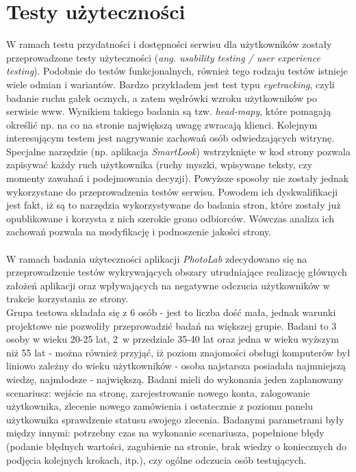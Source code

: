 \section{Testy użyteczności}
\quad W ramach testu przydatności i dostępności serwisu dla użytkowników zostały przeprowadzone testy użyteczności (\textit{ang. usability testing / user experience testing}). Podobnie do testów funkcjonalnych, również tego rodzaju testów istnieje wiele odmian i wariantów. Bardzo przykładem jest test typu \textit{eyetracking}, czyli badanie ruchu gałek ocznych, a zatem wędrówki wzroku użytkowników po serwisie www. Wynikiem takiego badania są tzw. \textit{head-mapy}, które pomagają określić np. na co na stronie największą uwagę zwracają klienci. Kolejnym interesującym testem jest nagrywanie zachowań osób odwiedzających witrynę. Specjalne narzędzie (np. aplikacja \textit{SmartLook}) wstrzyknięte w kod strony pozwala zapisywać każdy ruch użytkownika (ruchy myszki, wpisywane teksty, czy momenty zawahań i podejmowania decyzji). Powyższe sposoby nie zostały jednak wykorzystane do przeprowadzenia testów serwisu. Powodem ich dyskwalifikacji jest fakt, iż są to narzędzia wykorzystywane do badania stron, które zostały już opublikowane i korzysta z nich szerokie grono odbiorców. Wówczas analiza ich zachowań pozwala na modyfikację i podnoszenie jakości strony. \\
\\
W ramach badania użyteczności aplikacji \textit{PhotoLab} zdecydowano się na przeprowadzenie testów wykrywających obszary utrudniające realizację głównych założeń aplikacji oraz wpływających na negatywne odczucia użytkowników w trakcie korzystania ze strony.\\
Grupa testowa składała się z 6 osób - jest to liczba dość mała, jednak warunki projektowe nie pozwoliły przeprowadzić badań na większej grupie. Badani to 3 osoby w wieku 20-25 lat, 2~w przedziale 35-40 lat oraz jedna w wieku wyższym niż 55 lat - można również przyjąć, iż poziom znajomości obsługi komputerów był liniowo zależny do wieku użytkowników - osoba najstarsza posiadała najmniejszą wiedzę, najmłodsze - największą. Badani mieli do wykonania jeden zaplanowany scenariusz: wejście na stronę, zarejestrowanie nowego konta, zalogowanie użytkownika, zlecenie nowego zamówienia i ostatecznie z poziomu panelu użytkownika sprawdzenie statusu swojego zlecenia. Badanymi parametrami były między innymi: potrzebny czas na wykonanie scenariusza, popełnione błędy (podanie błędnych wartości, zagubienie na stronie, brak wiedzy o koniecznych do podjęcia kolejnych krokach, itp.), czy ogólne odczucia osób testujących.\\
